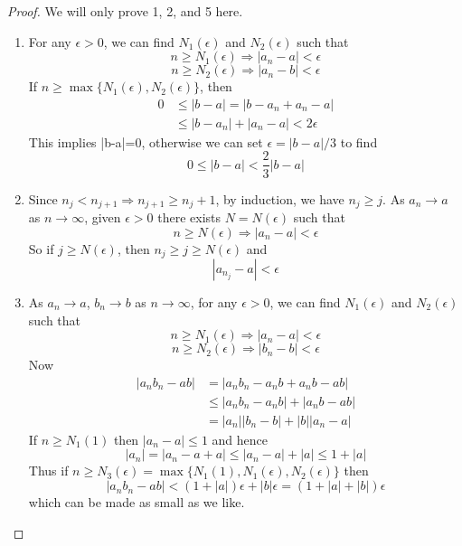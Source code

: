 \documentclass[10pt, a4paper, twoside]{report}
\begin{document}
\begin{proof}
    We will only prove 1, 2, and 5 here.
    \begin{enumerate}
        \item For any \(\epsilon>0\), we can find \(N_1(\epsilon)\) and \(N_2(\epsilon)\) such that
        \[n\geq N_1(\epsilon)\Rightarrow|a_n-a|<\epsilon\]
        \[n\geq N_2(\epsilon)\Rightarrow|a_n-b|<\epsilon\]
        If \(n\geq\max\{N_1(\epsilon),N_2(\epsilon)\}\), then
        \begin{align*}
            0&\leq|b-a|=|b-a_n+a_n-a| \\
            &\leq|b-a_n|+|a_n-a|<2\epsilon
        \end{align*}
        This implies |b-a|=0, otherwise we can set \(\epsilon=|b-a|/3\) to find
        \[0\leq|b-a|<\frac 23|b-a|\]
        \hfill\qedsymbol
        \item Since \(n_j<n_{j+1}\Rightarrow n_{j+1}\geq n_j+1\), by induction, we have \(n_j\geq j\). As \(a_n\to a\) as \(n\to\infty\), given \(\epsilon>0\) there exists \(N=N(\epsilon)\) such that 
        \[n\geq N(\epsilon)\Rightarrow|a_n-a|<\epsilon\]
        So if \(j\geq N(\epsilon)\), then \(n_j\geq j\geq N(\epsilon)\) and 
        \[|a_{n_j}-a|<\epsilon\]
        \hfill\qedsymbol
        \item As \(a_n\to a\), \(b_n\to b\) as \(n\to\infty\), for any \(\epsilon>0\), we can find \(N_1(\epsilon)\) and \(N_2(\epsilon)\) such that
        \[n\geq N_1(\epsilon)\Rightarrow|a_n-a|<\epsilon\]
        \[n\geq N_2(\epsilon)\Rightarrow|b_n-b|<\epsilon\]
        Now
        \begin{align*}
            |a_nb_n-ab|&=|a_nb_n-a_nb+a_nb-ab| \\
            &\leq|a_nb_n-a_nb|+|a_nb-ab| \\
            &=|a_n||b_n-b|+|b||a_n-a|
        \end{align*}
        If \(n\geq N_1(1)\) then \(|a_n-a|\leq 1\) and hence
        \[|a_n|=|a_n-a+a|\leq |a_n-a|+|a|\leq 1+|a|\]
        Thus if \(n\geq N_3(\epsilon)=\max\{N_1(1),N_1(\epsilon),N_2(\epsilon)\}\) then
        \[|a_nb_n-ab|<(1+|a|)\epsilon+|b|\epsilon=(1+|a|+|b|)\epsilon\]
        which can be made as small as we like.
    \end{enumerate}
\end{proof}
\end{document}
